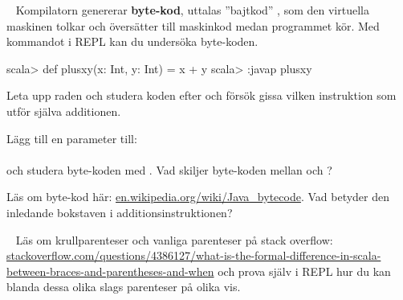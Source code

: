 \newpage

\AdvancedTasks %





\QUESTBEGIN

\Task  \what~  Kompilatorn genererar \textbf{byte-kod}, uttalas ''bajtkod'' , som den virtuella maskinen tolkar och översätter till maskinkod medan programmet kör. Med kommandot  i REPL kan du undersöka byte-koden.
\begin{REPL}
scala> def plusxy(x: Int, y: Int) = x + y
scala> :javap plusxy
\end{REPL}

\Subtask Leta upp raden  och studera koden efter  och försök gissa vilken instruktion som utför själva additionen.

\Subtask Lägg till en parameter till: \\ 
\\ och studera byte-koden med . Vad skiljer byte-koden mellan  och ?

\Subtask\Pen Läs om byte-kod här: \href{https://en.wikipedia.org/wiki/Java\_bytecode}{en.wikipedia.org/wiki/Java\_bytecode}. Vad betyder den inledande bokstaven i additionsinstruktionen?


\SOLUTION


\QUESTEND











\QUESTBEGIN

\Task  \what~ Läs om krullparenteser och vanliga parenteser på stack overflow: \\ \href{http://stackoverflow.com/questions/4386127/what-is-the-formal-difference-in-scala-between-braces-and-parentheses-and-when}{stackoverflow.com/questions/4386127/what-is-the-formal-difference-in-scala-between-braces-and-parentheses-and-when} och prova själv i REPL hur du kan blanda dessa olika slags parenteser på olika vis.

\SOLUTION


\QUESTEND






